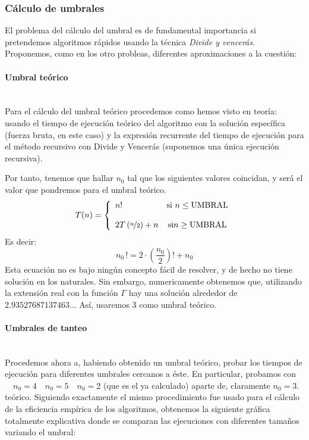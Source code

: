 \documentclass{article}
\newcommand{\myparagraph}[1]{\paragraph{#1}\mbox{}\\}
\begin{document}
\subsubsection{Cálculo de umbrales} %
El problema del cálculo del umbral es de fundamental importancia
si pretendemos algoritmos rápidos usando la técnica \textit{Divide y vencerás}. Proponemos, como en los otro probleas, diferentes aproximaciones a la cuestión:
\myparagraph{Umbral teórico}    
Para el cálculo del umbral teórico procedemos como hemos visto en teoría: usando el tiempo de ejecución teórico del algoritmo
con la solución específica (fuerza bruta, en este caso) y 
la expresión recurrente del tiempo de ejecución para el método
recursivo con Divide y Vencerás (suponemos una única ejecución recursiva). 

Por tanto, tenemos que hallar $n_0$ tal que los siguientes
valores coincidan, y será el valor que pondremos
para el umbral teórico.
\begin{equation}
    T(n) = \left\{
	\begin{array}{lcc}
	    n! & \text{si } n \le \text{\text{UMBRAL}} \\
	    \\
	    2T\left(\nicefrac{n}{2}\right) + n & \text{si} n \ge \text{\text{UMBRAL}} \\
	\end{array}
	\right.
\end{equation} 
Es decir:
\
\[
    n_0\,! = 2\cdot\left( \frac{n_0}{2} \right) ! + n_0
\] 
Esta ecuación no es bajo ningún concepto fácil de resolver, y de hecho no tiene solución en los naturales. Sin embargo, numericamente obtenemos que, utilizando la extensión real con la función $\Gamma$ hay una solución alrededor de $2.93527687137463\ldots$ Así,
usaremos 3 como umbral teórico.

\myparagraph{Umbrales de tanteo}
Procedemos ahora a, habiendo obtenido un umbral teórico,
probar los tiempos de ejecución para diferentes umbrales cercanos
a éste. En particular, probamos con $\quad n_0 = 4 \quad n_0 = 5\quad n_0=2$ (que es el ya calculado) aparte de, claramente $n_0 = 3$. 
teórico.
\newline
Siguiendo exactamente el mismo procedimiento fue usado para el cálculo de la eficiencia empírica de los algoritmos, obtenemos la siguiente gráfica totalmente explicativa donde se comparan las ejecuciones con diferentes tamaños variando el umbral:
\end{document}
